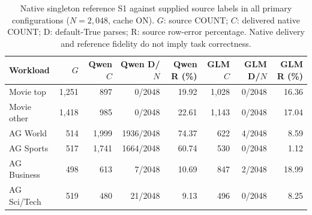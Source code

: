 \begin{table}[t]
\centering\small
\caption{Native singleton reference S1 against supplied source labels in all primary configurations ($N=2,048$, cache ON). $G$: source COUNT; $C$: delivered native COUNT; D: default-True parses; R: source row-error percentage. Native delivery and reference fidelity do not imply task correctness.}
\label{tab:reference_quality}
\begin{tabular}{lrrrrrrr}
\toprule
Workload & $G$ & Qwen $C$ & Qwen D/$N$ & Qwen R (\%) & GLM $C$ & GLM D/$N$ & GLM R (\%) \\
\midrule
Movie top & 1,251 & 897 & 0/2048 & 19.92 & 1,028 & 0/2048 & 16.36 \\
Movie other & 1,418 & 985 & 0/2048 & 22.61 & 1,143 & 0/2048 & 17.04 \\
AG World & 514 & 1,999 & 1936/2048 & 74.37 & 622 & 4/2048 & 8.59 \\
AG Sports & 517 & 1,741 & 1664/2048 & 60.74 & 530 & 0/2048 & 1.12 \\
AG Business & 498 & 613 & 7/2048 & 10.69 & 847 & 2/2048 & 18.99 \\
AG Sci/Tech & 519 & 480 & 21/2048 & 9.13 & 496 & 0/2048 & 8.25 \\
\bottomrule
\end{tabular}
\end{table}
